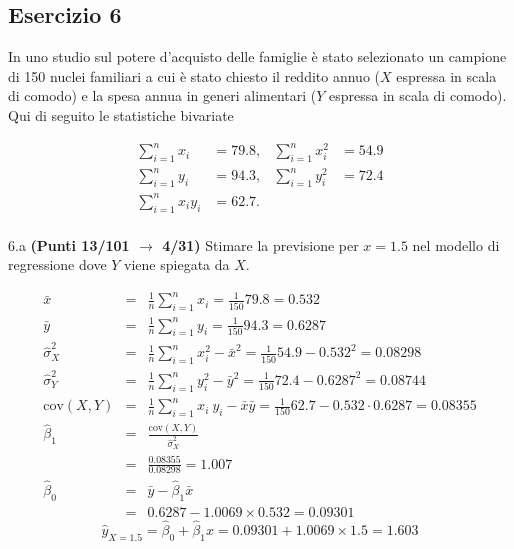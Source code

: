 \documentclass[
  11pt,
]{book}
\theoremstyle{mytheoremstyle}
\theoremstyle{mydefstyle}
\newenvironment{sol}
  {
  \begin{tcolorbox}[enhanced,breakable,arc=0.1mm,boxrule=1pt,colback=white,colframe=iblue,
  title=\bf \fontfamily{lmss}\selectfont \hspace{.5 cm} Soluzione,drop fuzzy shadow]

}{
\end{tcolorbox}
  }
\begin{document}
\subsection{Esercizio 6}\label{esercizio-6-19}

In uno studio sul potere d'acquisto delle famiglie è stato selezionato un campione di 150 nuclei familiari
a cui è stato chiesto il reddito annuo (\(X\) espressa in scala di comodo) e la spesa annua in generi alimentari (\(Y\) espressa in scala di comodo). Qui di seguito le statistiche bivariate

\begin{align*}
\sum_{i=1}^n x_i &= 79.8,   &\sum_{i=1}^n x_i^2 &= 54.9 \\
\sum_{i=1}^n y_i &= 94.3,   &\sum_{i=1}^n y_i^2 &= 72.4 \\
\sum_{i=1}^n x_iy_i &= 62.7.    \\
\end{align*}

6.a \textbf{(Punti 13/101 \(\rightarrow\) 4/31)} Stimare la previsione per \(x=1.5\) nel modello di regressione dove \(Y\) viene spiegata da \(X\).

\begin{sol}
\begin{eqnarray*}
           \bar x &=&\frac 1 n\sum_{i=1}^n x_i = \frac {1}{ 150 }  79.8 =  0.532 \\
           \bar y &=&\frac 1 n\sum_{i=1}^n y_i = \frac {1}{ 150 }  94.3 =  0.6287 \\
           \hat\sigma_X^2&=&\frac 1 n\sum_{i=1}^n x_i^2-\bar x^2=\frac {1}{ 150 }  54.9  - 0.532 ^2= 0.08298 \\
           \hat\sigma_Y^2&=&\frac 1 n\sum_{i=1}^n y_i^2-\bar y^2=\frac {1}{ 150 }  72.4  - 0.6287 ^2= 0.08744 \\
           \text{cov}(X,Y)&=&\frac 1 n\sum_{i=1}^n x_i~y_i-\bar x\bar y=\frac {1}{ 150 }  62.7 - 0.532 \cdot 0.6287 = 0.08355 \\
           \hat\beta_1 &=& \frac{\text{cov}(X,Y)}{\hat\sigma_X^2} \\
                    &=& \frac{ 0.08355 }{ 0.08298 }  =  1.007 \\
           \hat\beta_0 &=& \bar y - \hat\beta_1 \bar x\\
                    &=&  0.6287 - 1.0069 \times  0.532 = 0.09301 
         \end{eqnarray*}\[\hat y_{X= 1.5 }=\hat\beta_0+\hat\beta_1 x= 0.09301 + 1.0069 \times 1.5 = 1.603 \]

\end{sol}
\end{document}
